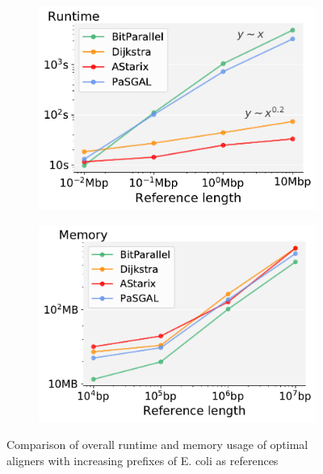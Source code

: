 \begin{figure}[t]
  \begin{subfigure}{.45\textwidth}
    \centering
    \includegraphics[width=\linewidth]{figs/cmp/performance_vs_genomesize-head_Mbpxs.pdf}
  \end{subfigure}
  \begin{subfigure}{.45\textwidth}
    \centering
    \includegraphics[width=\linewidth]{figs/cmp/memory_vs_genomesize-headxmax_rss.pdf}
  \end{subfigure}
  \caption[Performance scaling with reference size]{Comparison of overall
     runtime and memory usage of optimal aligners with increasing prefixes of E.
     coli as references}
  \label{TRIEfig:scaling_with_graphsize}
\end{figure}

